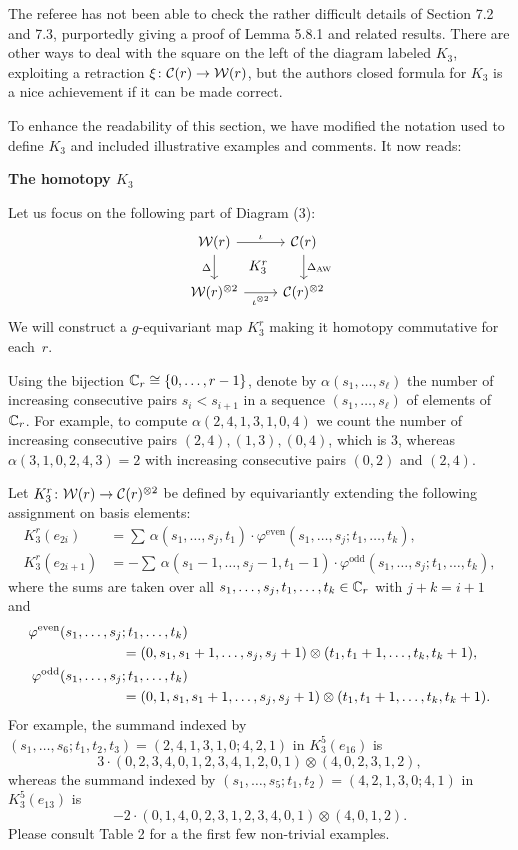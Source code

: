     \subitem The referee has not been able to check the rather difficult details of Section 7.2 and 7.3, purportedly giving a proof of Lemma 5.8.1 and related results. There are other ways to deal with the square on the left of the diagram labeled $K_3$, exploiting a retraction $\xi\colon \mathcal{C}(r)\to \mathcal{W}(r)$, but the authors closed formula for $K_3$ is a nice achievement if it can be made correct.

	\ar To enhance the readability of this section, we have modified the notation used to define $K_3$ and included illustrative examples and comments. It now reads:

	\medskip\noindent\textbf{The homotopy $K_3$}

	\medskip\noindent Let us focus on the following part of Diagram (3):
	\[
	\begin{tikzcd}
		\cW(r)
		\arrow[r,"\iota"]
		\arrow[d,"\Delta"']
		\arrow[dr,phantom,"K_3^r"]
		& \cC(r)
		\arrow[d,"\Delta_{\AW}"] \\
		\cW(r)^{\ot 2}
		\arrow[r,"\iota^{\ot 2}"']
		& \cC(r)^{\ot 2}
	\end{tikzcd}
	\]
	We will construct a $g$-equivariant map $K_3^r$ making it homotopy commutative for each~$r$.

	Using the bijection $\mathbb{C}_r \cong \{0,\dots,r-1\}$, denote by $\alpha(s_1,\dots,s_\ell)$ the number of increasing consecutive pairs $s_i < s_{i+1}$ in a sequence $(s_1,\ldots,s_\ell)$ of elements of $\mathbb{C}_r$.
	For example, to compute $\alpha(2,4,1,3,1,0,4)$ we count the number of increasing consecutive pairs $(2,4),(1,3),(0,4)$, which is $3$, whereas $\alpha(3,1,0,2,4,3) = 2$ with increasing consecutive pairs $(0,2)$ and $(2,4)$.

	Let $K_3^r \colon \mathcal{W}(r) \to \mathcal{C}(r)^{\otimes 2}$ be defined by equivariantly extending the following assignment on basis elements:
	\[
	\begin{split}
		K_3^r(e_{2i}) &= \sum \, \alpha(s_1,\ldots,s_j,t_1)\cdot\varphi^{\mathrm{even}}(s_1,\dots,s_j;t_1,\dots,t_k), \\
		K_3^r(e_{2i+1}) &= -\sum \, \alpha(s_1-1,\ldots,s_j-1,t_1-1)\cdot \varphi^{\mathrm{odd}}(s_1,\dots,s_j;t_1,\dots,t_k),
	\end{split}
	\]
	where the sums are taken over all $s_1,\dots,s_j,t_1,\dots,t_k \in \mathbb{C}_r$ with $j+k = i+1$ and
	\begin{align*}
		\varphi^{\mathrm{even}}(s_1,\dots,s_j&;t_1,\dots,t_k) \\ &=
		(0,s_1,s_1+1,\dots,s_j,s_j+1) \otimes (t_1,t_1+1,\dots,t_k,t_k+1), \\
		\varphi^{\mathrm{odd}}(s_1,\dots,s_j&;t_1,\dots,t_k) \\ &=
		(0,1,s_1,s_1+1,\dots,s_j,s_j+1) \otimes (t_1,t_1+1,\dots,t_k,t_k+1).
	\end{align*}
	For example, the summand indexed by $(s_1,\ldots,s_6;t_1,t_2,t_3) = (2,4,1,3,1,0;4,2,1)$ in $K_3^5(e_{16})$ is
	\[
	3 \cdot (0,2,3,4,0,1,2,3,4,1,2,0,1) \otimes (4,0,2,3,1,2),
	\]
	whereas the summand indexed by $(s_1,\ldots,s_5;t_1,t_2) =(4,2,1,3,0;4,1)$ in $K_3^5(e_{13})$ is
	\[
	-2 \cdot (0,1,4,0,2,3,1,2,3,4,0,1) \otimes (4,0,1,2).
	\]
	Please consult Table 2 for a the first few non-trivial examples.

